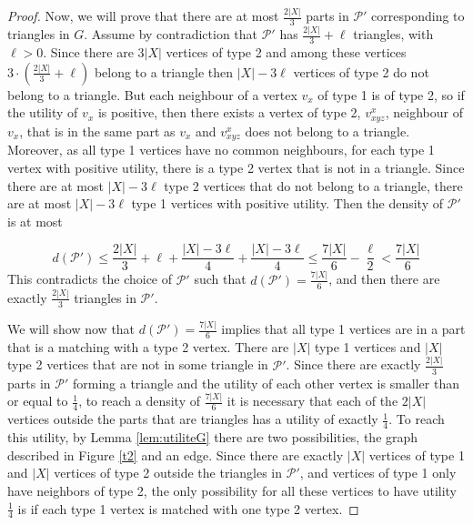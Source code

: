 \documentclass[a4paper,USenglish,cleveref, autoref]{lipics-v2021}
\begin{document}
\begin{proof}
Now, we will prove that there are at most $\frac{2|X|}{3}$ parts in $\mathcal{P'}$ corresponding to triangles in $G$. Assume by contradiction that $\mathcal{P'}$ has $\frac{2|X|}{3} + \ell$ triangles, with $\ell > 0$. Since there are $3|X|$ vertices of type 2 and among these vertices $3\cdot(\frac{2|X|}{3} + \ell)$   belong to a triangle then $|X|-3 \ell$ vertices of type 2 do not belong to a triangle. But each neighbour of a vertex $v_x$ of type 1 is of type 2, so if  the utility of $v_x$ is positive, then there exists a vertex of type 2, $v^x_{xyz}$, neighbour of $v_x$,  that is in the same part as $v_x$ and $v^x_{xyz}$  does not belong to a triangle. Moreover, as all type 1 vertices have no common neighbours, for each type 1 vertex with positive utility, there is a type 2 vertex that is not in a triangle. Since there are at most $|X|-3 \ell$ type 2 vertices that do not belong to a triangle, there are at most $|X|-3 \ell$ type 1 vertices with positive utility.  Then the density of $\mathcal{P'}$ is at most

 

\[
    d(\mathcal{P'}) \leq \frac{2|X|}{3}+ \ell + \frac{|X| - 3 \ell}{4} + \frac{|X| - 3 \ell}{4} \leq \frac{7|X|}{6} - \frac{\ell}{2} < \frac{7|X|}{6}
\]
This contradicts   the choice of  $\mathcal{P'}$ such that  $d(\mathcal{P'})=\frac{7|X|}{6}$,  and then there are exactly $\frac{2|X|}{3}$ triangles in $\mathcal{P'}$.

We will show now that  $d(\mathcal{P'}) = \frac{7|X|}{6}$ implies that all type 1 vertices are in a part that is a matching with a type 2 vertex. There are $|X|$ type 1 vertices and $|X|$ type 2 vertices that are not in some triangle in $\mathcal{P'}$.  Since there are exactly  $\frac{2|X|}{3}$ parts in $\mathcal{P'}$ forming a triangle and the utility of each other vertex is smaller than or equal to $\frac{1}{4}$, to reach a density of $\frac{7|X|}{6}$ it is necessary that each of the $2|X|$ vertices outside the parts that are triangles  has a utility of exactly $\frac{1}{4}$.  To reach this utility, by Lemma \ref{lem:utiliteG} there are two possibilities, the graph described in Figure \ref{t2} and an edge. Since there are exactly $|X|$ vertices of type 1  and $|X|$  vertices of type 2  outside the triangles in $\mathcal{P'}$, and vertices of type 1 only have neighbors of type 2, the only possibility for all these vertices to have utility $\frac{1}{4}$ is if each type 1 vertex is matched with one type 2 vertex.


\end{proof}
\end{document}
